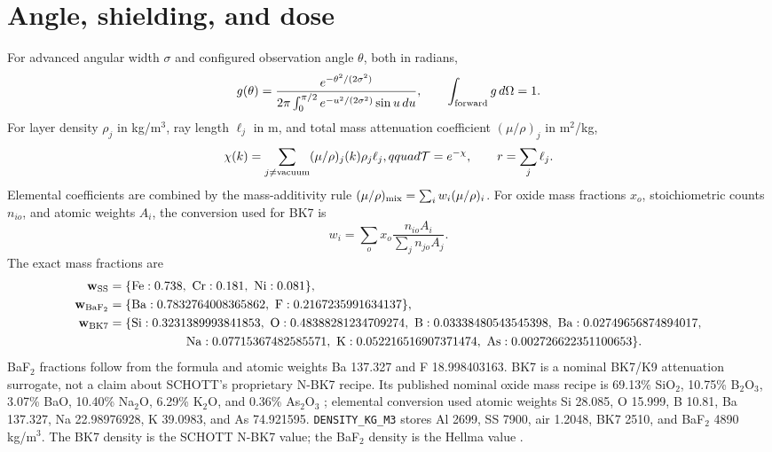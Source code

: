 \documentclass[10pt,a4paper]{article}
\begin{document}
\section{Angle, shielding, and dose}
For advanced angular width $\sigma$ and configured observation angle $\theta$, both in radians,
\begin{equation}
g(\theta)=\frac{e^{-\theta^2/(2\sigma^2)}}{2\pi\int_0^{\pi/2}e^{-u^2/(2\sigma^2)}\sin u\,du},
\qquad\int_{\rm forward}g\,d\Omega=1.
\end{equation}
For layer density $\rho_j$ in kg/m$^3$, ray length $\ell_j$ in m, and total mass attenuation coefficient $(\mu/\rho)_j$ in m$^2$/kg,
\begin{equation}\chi(k)=\sum_{j\ne\rm vacuum}(\mu/\rho)_j(k)\rho_j\ell_j,qquad \mathcal T=e^{-\chi},\qquad r=\sum_j\ell_j.\end{equation}
Elemental coefficients are combined by the mass-additivity rule $(\mu/\rho)_{\rm mix}=\sum_iw_i(\mu/\rho)_i$. For oxide mass fractions $x_o$, stoichiometric counts $n_{io}$, and atomic weights $A_i$, the conversion used for BK7 is
\begin{equation}w_i=\sum_o x_o\frac{n_{io}A_i}{\sum_j n_{jo}A_j}.\end{equation}
The exact mass fractions are
\begin{align}
\mathbf w_{\rm SS}&=\{\mathrm{Fe}:0.738,\ \mathrm{Cr}:0.181,\ \mathrm{Ni}:0.081\},\\
\mathbf w_{\rm BaF_2}&=\{\mathrm{Ba}:0.7832764008365862,\ \mathrm F:0.2167235991634137\},\\
\mathbf w_{\rm BK7}&=\{\mathrm{Si}:0.3231389993841853,\ \mathrm O:0.48388281234709274,\
\mathrm B:0.03338480543545398,\ \mathrm{Ba}:0.02749656874894017,\\
&\hspace{22mm}\mathrm{Na}:0.07715367482585571,\ \mathrm K:0.052216516907371474,\
\mathrm{As}:0.002726622351100653\}.
\end{align}
BaF$_2$ fractions follow from the formula and atomic weights Ba 137.327 and F 18.998403163. BK7 is a nominal BK7/K9 attenuation surrogate, not a claim about SCHOTT's proprietary N-BK7 recipe. Its published nominal oxide mass recipe is 69.13\% SiO$_2$, 10.75\% B$_2$O$_3$, 3.07\% BaO, 10.40\% Na$_2$O, 6.29\% K$_2$O, and 0.36\% As$_2$O$_3$ \cite{bk7recipe}; elemental conversion used atomic weights Si 28.085, O 15.999, B 10.81, Ba 137.327, Na 22.98976928, K 39.0983, and As 74.921595. \texttt{DENSITY\_KG\_M3} stores Al 2699, SS 7900, air 1.2048, BK7 2510, and BaF$_2$ 4890 kg/m$^3$. The BK7 density is the SCHOTT N-BK7 value; the BaF$_2$ density is the Hellma value \cite{bk7,baf2}.
\end{document}

